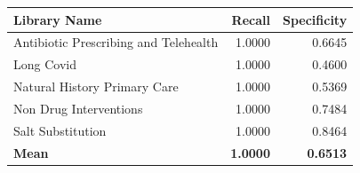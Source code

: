 \begin{tabularx}{\textwidth}{@{} X r r @{}}
\toprule
\textbf{Library Name} & \textbf{Recall} & \textbf{Specificity} \\
\midrule
Antibiotic Prescribing and Telehealth & 1.0000 & 0.6645 \\
Long Covid & 1.0000 & 0.4600 \\
Natural History Primary Care & 1.0000 & 0.5369 \\
Non Drug Interventions & 1.0000 & 0.7484 \\
Salt Substitution & 1.0000 & 0.8464 \\
\midrule
\textbf{Mean} & \textbf{1.0000} & \textbf{0.6513} \\
\bottomrule
\end{tabularx}